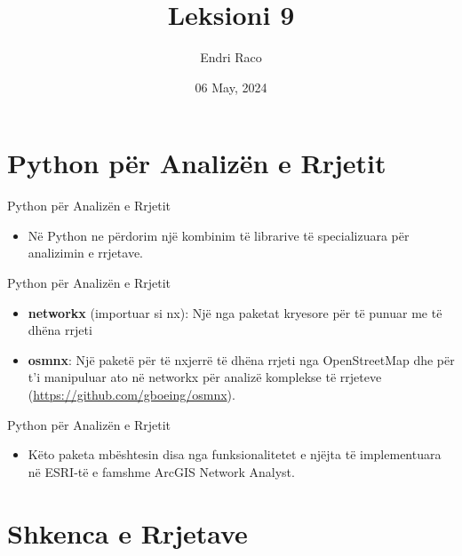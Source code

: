 \documentclass[
  ignorenonframetext,
]{beamer}
\title{Leksioni 9}
\author{Endri Raco}
\date{06 May, 2024}
\providecommand{\tightlist}{%
  \setlength{\itemsep}{0pt}\setlength{\parskip}{0pt}}
\begin{document}
\frame{\titlepage}

\begin{frame}[allowframebreaks]
  \tableofcontents[hideallsubsections]
\end{frame}
\hypertarget{python-puxebr-analizuxebn-e-rrjetit}{%
\section{Python për Analizën e
Rrjetit}\label{python-puxebr-analizuxebn-e-rrjetit}}

\begin{frame}{Python për Analizën e Rrjetit}
\protect\hypertarget{python-puxebr-analizuxebn-e-rrjetit-1}{}
\begin{itemize}
\tightlist
\item
  Në Python ne përdorim një kombinim të librarive të specializuara për
  analizimin e rrjetave.
\end{itemize}
\end{frame}

\begin{frame}{Python për Analizën e Rrjetit}
\protect\hypertarget{python-puxebr-analizuxebn-e-rrjetit-2}{}
\begin{itemize}
\item
  \textbf{networkx} (importuar si nx): Një nga paketat kryesore për të
  punuar me të dhëna rrjeti
\item
  \textbf{osmnx}: Një paketë për të nxjerrë të dhëna rrjeti nga
  OpenStreetMap dhe për t'i manipuluar ato në networkx për analizë
  komplekse të rrjeteve (\url{https://github.com/gboeing/osmnx}).
\end{itemize}
\end{frame}

\begin{frame}{Python për Analizën e Rrjetit}
\protect\hypertarget{python-puxebr-analizuxebn-e-rrjetit-3}{}
\begin{itemize}
\tightlist
\item
  Këto paketa mbështesin disa nga funksionalitetet e njëjta të
  implementuara në ESRI-të e famshme ArcGIS Network Analyst.
\end{itemize}
\end{frame}

\hypertarget{shkenca-e-rrjetave}{%
\section{Shkenca e Rrjetave}\label{shkenca-e-rrjetave}}
\end{document}
